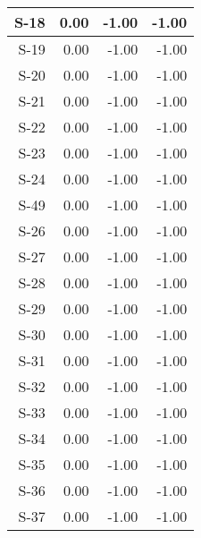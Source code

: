 \begin{tabular}{ | r | r | r | r | }
    \hline
                  S-18  &            0.00  &           -1.00  &           -1.00  \\
    \hline
                  S-19  &            0.00  &           -1.00  &           -1.00  \\
    \hline
                  S-20  &            0.00  &           -1.00  &           -1.00  \\
    \hline
                  S-21  &            0.00  &           -1.00  &           -1.00  \\
    \hline
                  S-22  &            0.00  &           -1.00  &           -1.00  \\
    \hline
                  S-23  &            0.00  &           -1.00  &           -1.00  \\
    \hline
                  S-24  &            0.00  &           -1.00  &           -1.00  \\
    \hline
                  S-49  &            0.00  &           -1.00  &           -1.00  \\
    \hline
                  S-26  &            0.00  &           -1.00  &           -1.00  \\
    \hline
                  S-27  &            0.00  &           -1.00  &           -1.00  \\
    \hline
                  S-28  &            0.00  &           -1.00  &           -1.00  \\
    \hline
                  S-29  &            0.00  &           -1.00  &           -1.00  \\
    \hline
                  S-30  &            0.00  &           -1.00  &           -1.00  \\
    \hline
                  S-31  &            0.00  &           -1.00  &           -1.00  \\
    \hline
                  S-32  &            0.00  &           -1.00  &           -1.00  \\
    \hline
                  S-33  &            0.00  &           -1.00  &           -1.00  \\
    \hline
                  S-34  &            0.00  &           -1.00  &           -1.00  \\
    \hline
                  S-35  &            0.00  &           -1.00  &           -1.00  \\
    \hline
                  S-36  &            0.00  &           -1.00  &           -1.00  \\
    \hline
                  S-37  &            0.00  &           -1.00  &           -1.00  \\

\end{tabular}
